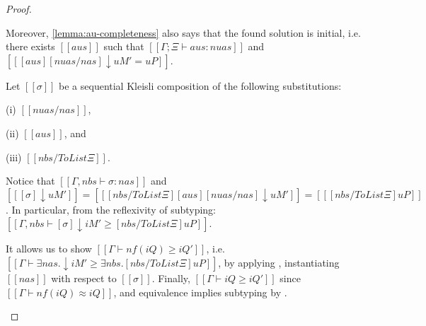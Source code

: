 \begin{proof}
\begin{caseof}
    Moreover, \cref{lemma:au-completeness} also says that the found solution 
    is initial, i.e. there exists $[[aus]]$ such that
     $[[Γ;Ξ ⊢ aus : nuas]]$ and $[[ [aus][nuas/nas]↓uM' = uP ]]$.

     Let $[[σ]]$ be a sequential Kleisli composition of the following
     substitutions:
     \begin{enumerate*}
     \item[(i)] $[[nuas/nas]]$,
     \item[(ii)] $[[aus]]$, and
     \item[(iii)] $[[nbs / ToList Ξ]]$.
     \end{enumerate*}
     Notice that $[[Γ, nbs ⊢ σ : nas]]$
     and $[[ [σ]↓uM' ]] = [[ [nbs / ToList Ξ][aus][nuas/nas]↓uM' ]] = [[ [nbs /
     ToList Ξ]uP ]]$. In particular, from the reflexivity of subtyping:
     $[[Γ, nbs ⊢ [σ]↓iM' ≥ [nbs / ToList Ξ]uP]]$.

     It allows us to show $[[Γ ⊢ nf(iQ) ≥ iQ']]$, i.e. $[[Γ ⊢ ∃nas.↓iM' ≥
     ∃nbs.[nbs / ToList Ξ]uP]]$, by applying ,
     instantiating $[[nas]]$ with respect to $[[σ]]$. Finally, $[[Γ ⊢ iQ ≥ iQ']]$
     since $[[Γ ⊢ nf(iQ) ≈ iQ]]$, and equivalence implies subtyping by .
  \end{caseof}
\end{proof}
